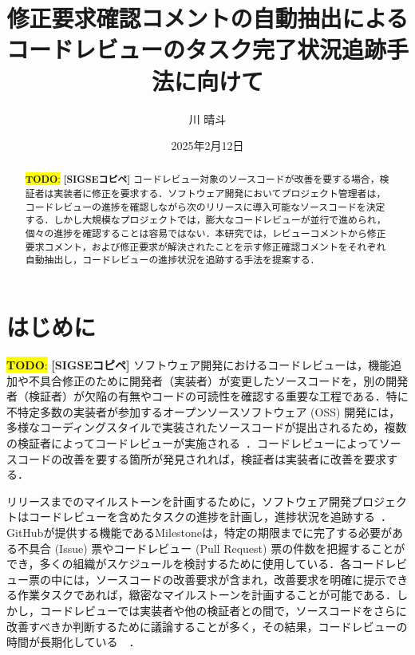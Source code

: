 \documentclass[11pt]{jreport}
\title{修正要求確認コメントの自動抽出による\\
コードレビューのタスク完了状況追跡手法に向けて}
\author{川\UTF{FA11} 晴斗}
\date{2025年2月12日}	%
\newcommand{\todo}[1]{\colorbox{yellow}{{\bf TODO}:}{\color{red} {\textbf{[#1]}}}}
\begin{document}
\maketitle

\begin{abstract}
\todo{SIGSEコピペ}
コードレビュー対象のソースコードが改善を要する場合，検証者は実装者に修正を要求する．ソフトウェア開発においてプロジェクト管理者は，コードレビューの進捗を確認しながら次のリリースに導入可能なソースコードを決定する．しかし大規模なプロジェクトでは，膨大なコードレビューが並行で進められ，個々の進捗を確認することは容易ではない．本研究では，レビューコメントから修正要求コメント，および修正要求が解決されたことを示す修正確認コメントをそれぞれ自動抽出し，コードレビューの進捗状況を追跡する手法を提案する．
\end{abstract}

\tableofcontents



\newpage
{}	%



\chapter{はじめに}

\todo{SIGSEコピペ}
ソフトウェア開発におけるコードレビューは，機能追加や不具合修正のために開発者（実装者）が変更したソースコードを，別の開発者（検証者）が欠陥の有無やコードの可読性を確認する重要な工程である\cite{quality1}\cite{quality2}．特に不特定多数の実装者が参加するオープンソースソフトウェア (OSS) 開発には，多様なコーディングスタイルで実装されたソースコードが提出されるため，複数の検証者によってコードレビューが実施される~\cite{review_process}．コードレビューによってソースコードの改善を要する箇所が発見されれば，検証者は実装者に改善を要求する．

リリースまでのマイルストーンを計画するために，ソフトウェア開発プロジェクトはコードレビューを含めたタスクの進捗を計画し，進捗状況を追跡する~\cite{review_time}．GitHubが提供する機能であるMilestoneは，特定の期限までに完了する必要がある不具合 (Issue) 票やコードレビュー (Pull Request) 票の件数を把握することができ，多くの組織がスケジュールを検討するために使用している．各コードレビュー票の中には，ソースコードの改善要求が含まれ，改善要求を明確に提示できる作業タスクであれば，緻密なマイルストーンを計画することが可能である．しかし，コードレビューでは実装者や他の検証者との間で，ソースコードをさらに改善すべきか判断するために議論することが多く，その結果，コードレビューの時間が長期化している~\cite{review_time1}~\cite{review_time2}．
\end{document}
